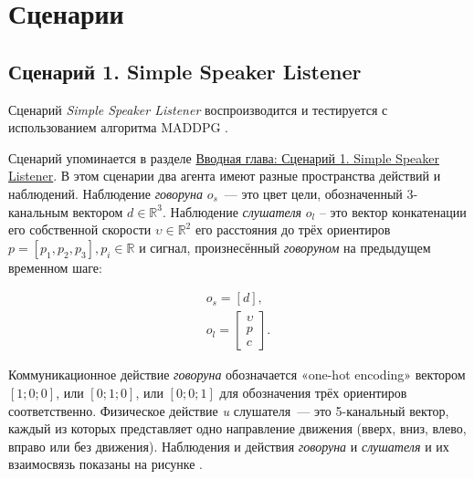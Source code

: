 \section{Сценарии}

\subsection{Сценарий 1. Simple Speaker Listener}  \label{exp-ssl}

Сценарий \textit{Simple Speaker Listener} воспроизводится и тестируется с использованием алгоритма MADDPG \cite{lowe2017multiagent}.

Сценарий упоминается в разделе \hyperref[intro:ssl]{Вводная глава: Сценарий 1. Simple Speaker Listener}. В этом сценарии два агента имеют разные пространства действий и наблюдений. Наблюдение \textit{говоруна} $o_s$~--- это цвет цели, обозначенный 3- канальным вектором $d \in \mathbb{R}^3$. Наблюдение \textit{слушателя} $o_l$ – это вектор конкатенации его собственной скорости $\upsilon \in \mathbb{R}^2$ его расстояния до трёх ориентиров $p = [p_1, p_2, p_3], p_i \in \mathbb{R}$ и сигнал, произнесённый \textit{говоруном} на предыдущем временном шаге:

\begin{equation}
    \begin{multlined}
        o_s = [d], \\
        o_l = \begin{bmatrix}
                  \upsilon \\ p \\ c
        \end{bmatrix}.
    \end{multlined}
\end{equation}

Коммуникационное действие \textit{говоруна} обозначается «one-hot encoding» вектором ${[1; 0; 0]}$, или ${[0; 1; 0]}$, или ${[0; 0; 1]}$ для обозначения трёх ориентиров соответственно.
Физическое действие \textit{u} слушателя~--- это 5-канальный вектор, каждый из которых представляет одно направление движения (вверх, вниз, влево, вправо или без движения). Наблюдения и действия \textit{говоруна} и \textit{слушателя} и их взаимосвязь показаны на рисунке .

